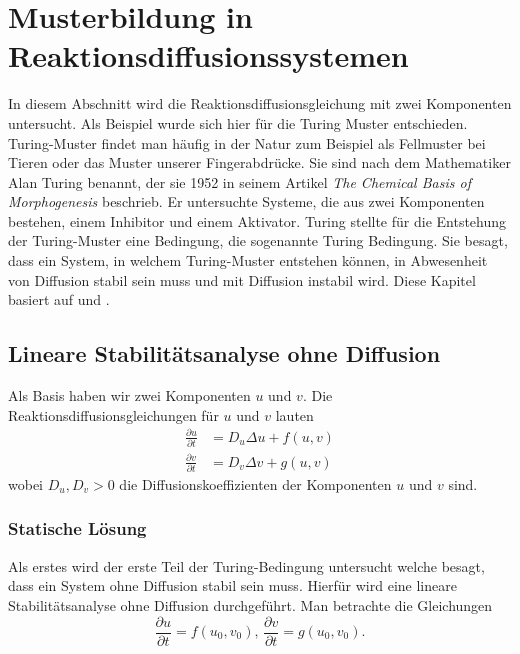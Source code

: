 %
%
%
%
\section{Musterbildung in Reaktionsdiffusionssystemen
\label{reaktdiff:section:teil1}}

In diesem Abschnitt wird die Reaktionsdiffusionsgleichung mit zwei Komponenten untersucht.
Als Beispiel wurde sich hier für die Turing Muster entschieden.
Turing-Muster findet man häufig in der Natur zum Beispiel als Fellmuster bei Tieren oder  das Muster unserer Fingerabdrücke.
Sie sind nach dem Mathematiker Alan Turing benannt, der sie 1952 in seinem Artikel \textit{The Chemical Basis of Morphogenesis}\cite{turing1952chemical} beschrieb.
Er untersuchte Systeme, die aus zwei Komponenten bestehen, einem Inhibitor und einem Aktivator.
Turing stellte für die Entstehung der Turing-Muster eine Bedingung, die sogenannte Turing Bedingung.
Sie besagt, dass ein System, in welchem Turing-Muster entstehen können, in Abwesenheit von Diffusion stabil sein muss und mit Diffusion instabil wird.
Diese Kapitel basiert auf \cite{reaktdiff:turing_patterns_2019} und \cite{reaktdiff:hoyle2006pattern}.

\subsection{Lineare Stabilitätsanalyse ohne Diffusion
\label{reaktdiff:subsection:mathe}}
Als Basis haben wir zwei Komponenten \(u\) und \(v\).
Die Reaktionsdiffusionsgleichungen für \(u\) und \(v\) lauten
\begin{align*}
    \frac{\partial u}{\partial t} &= D_u \Delta u + f(u,v)\\
    \label{reaktdiff:equation:reaktdiff2}
    \frac{\partial v}{\partial t} &= D_v \Delta v + g(u,v)
\end{align*}
wobei \(D_u, D_v > 0\) die Diffusionskoeffizienten der Komponenten \(u\) und \(v\) sind.

\subsubsection{Statische Lösung}
Als erstes wird der erste Teil der Turing-Bedingung untersucht welche besagt, dass ein System ohne Diffusion stabil sein muss.
Hierfür wird eine lineare Stabilitätsanalyse ohne Diffusion durchgeführt.
Man betrachte die Gleichungen
\begin{equation}
    \label{reaktdiff:equation:reaktdiff2ohneDiff}
    \frac{\partial u}{\partial t} = f(u_0,v_0),\,
    \frac{\partial v}{\partial t} = g(u_0,v_0).
\end{equation}

